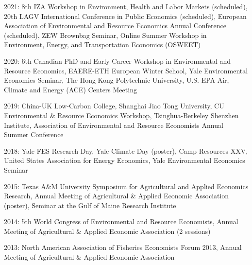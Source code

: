 

\begin{pubitems} %
    \item {2021: 8th IZA Workshop in Environment, Health and Labor Markets (scheduled), 20th LAGV International Conference in Public Economics (scheduled), European Association of Environmental and Resource Economics Annual Conference (scheduled), ZEW Brownbag Seminar, Online Summer Workshop in Environment, Energy, and Transportation Economics (OSWEET)}
    \item {2020: 6th Canadian PhD and Early Career Workshop in Environmental and Resource Economics, EAERE-ETH European Winter School, Yale Environmental Economics Seminar, The Hong Kong Polytechnic University, U.S. EPA Air, Climate and Energy (ACE) Centers Meeting}
    \item {2019: China-UK Low-Carbon College, Shanghai Jiao Tong University, CU Environmental \& Resource Economics Workshop, Tsinghua-Berkeley Shenzhen Institute, Association of Environmental and Resource Economists Annual Summer Conference}
    \item {2018: Yale FES Research Day, Yale Climate Day (poster), Camp Resources XXV, United States Association for Energy Economics, Yale Environmental Economics Seminar}
    \item {2015: Texas A\&M University Symposium for Agricultural and Applied Economics Research, Annual Meeting of Agricultural \& Applied Economic Association (poster), Seminar at the Gulf of Maine Research Institute}
    \item {2014: 5th World Congress of Environmental and Resource Economists, Annual Meeting of Agricultural \& Applied Economic Association (2 sessions)}
    \item {2013: North American Association of Fisheries Economists Forum 2013, Annual Meeting of Agricultural \& Applied Economic Association}
\end{pubitems}

